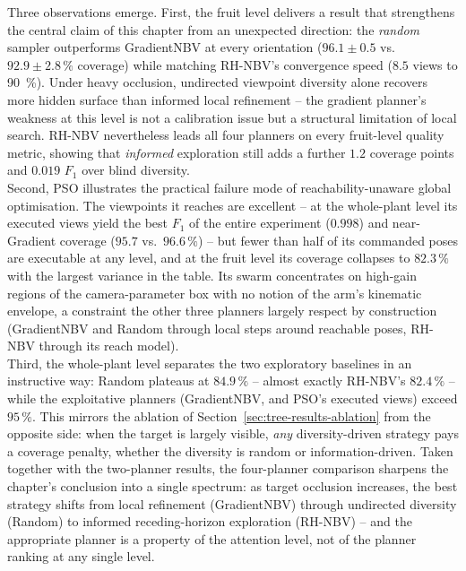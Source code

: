 Three observations emerge. First, the fruit level delivers a result that
strengthens the central claim of this chapter from an unexpected
direction: the \emph{random} sampler outperforms GradientNBV at every
orientation ($96.1 \pm 0.5$ vs.\ $92.9 \pm 2.8\,\%$ coverage) while
matching RH-NBV's convergence speed ($8.5$ views to \SI{90}{\percent}).
Under heavy occlusion, undirected viewpoint diversity alone recovers more
hidden surface than informed local refinement -- the gradient planner's
weakness at this level is not a calibration issue but a structural
limitation of local search. RH-NBV nevertheless leads all four planners on
every fruit-level quality metric, showing that \emph{informed} exploration
still adds a further $1.2$ coverage points and $0.019$ $F_1$ over blind
diversity.\\

Second, PSO illustrates the practical failure mode of
reachability-unaware global optimisation. The viewpoints it reaches are
excellent -- at the whole-plant level its executed views yield the best
$F_1$ of the entire experiment ($0.998$) and near-Gradient coverage
($95.7$ vs.\ $96.6\,\%$) -- but fewer than half of its commanded poses are
executable at any level, and at the fruit level its coverage collapses to
$82.3\,\%$ with the largest variance in the table. Its swarm concentrates
on high-gain regions of the camera-parameter box with no notion of the
arm's kinematic envelope, a constraint the other three planners largely
respect by construction (GradientNBV and Random through local steps around
reachable poses, RH-NBV through its reach model).\\

Third, the whole-plant level separates the two exploratory baselines in an
instructive way: Random plateaus at $84.9\,\%$ -- almost exactly RH-NBV's
$82.4\,\%$ -- while the exploitative planners (GradientNBV, and PSO's
executed views) exceed $95\,\%$. This mirrors the ablation of
Section~\ref{sec:tree-results-ablation} from the opposite side: when the
target is largely visible, \emph{any} diversity-driven strategy pays a
coverage penalty, whether the diversity is random or information-driven.
Taken together with the two-planner results, the four-planner comparison
sharpens the chapter's conclusion into a single spectrum: as target
occlusion increases, the best strategy shifts from local refinement
(GradientNBV) through undirected diversity (Random) to informed
receding-horizon exploration (RH-NBV) -- and the appropriate planner is a
property of the attention level, not of the planner ranking at any single
level.
